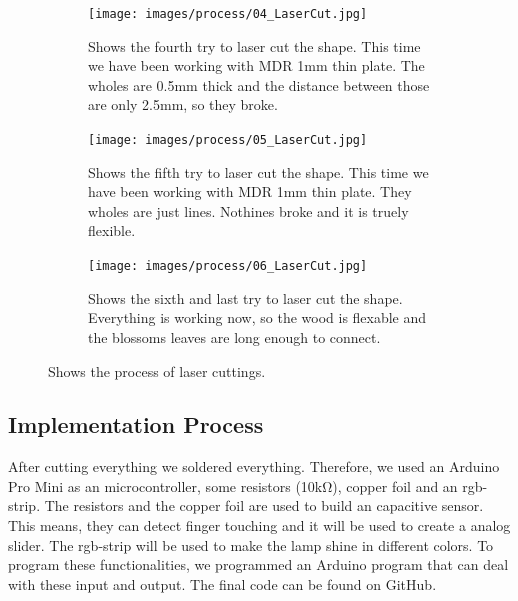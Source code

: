 \documentclass[doc.tex]{subfiles}
\begin{document}
\begin{figure}[H]
            \begin{subfigure}{.45\textwidth}
                \centering
                \texttt{[image: images/process/04\_LaserCut.jpg]}
                \caption{Shows the fourth try to laser cut the shape. This time we have been
                         working with MDR 1mm thin plate. The wholes are 0.5mm thick and the 
                         distance between those are only 2.5mm, so they broke.}
                \label{fig:04_LaserCut}
                \vspace{6mm}
            \end{subfigure}
            \hspace{1mm}
            \begin{subfigure}{.45\textwidth}
                \centering
                \texttt{[image: images/process/05\_LaserCut.jpg]}
                \caption{Shows the fifth try to laser cut the shape. This time we have been
                         working with MDR 1mm thin plate. They wholes are just lines. Nothines
                         broke and it is truely flexible.}
                \label{fig:04_LaserCut}
                \vspace{6mm}
            \end{subfigure}
            \hspace{1mm}
            \begin{subfigure}{.45\textwidth}
                \centering
                \texttt{[image: images/process/06\_LaserCut.jpg]}
                \caption{Shows the sixth and last try to laser cut the shape. Everything is 
                working now, so the wood is flexable and the blossoms leaves are long enough
                to connect. }
                \label{fig:04_LaserCut}
                \vspace{6mm}
            \end{subfigure}
            \caption{Shows the process of laser cuttings.}
            \label{fig:laserCutTests}
        \end{figure}
        \noindent

    \subsection{Implementation Process}
        \begin{flushleft}
            After cutting everything we soldered everything. Therefore, we used an Arduino Pro Mini \cite{arduinoProMini} 
            as an microcontroller, some resistors (10k\si{\ohm}), copper foil and an rgb-strip. \newline
            The resistors and the copper foil are used to build an capacitive sensor. \cite{Badger2019} 
            This means, they can detect finger touching and it will be used to create a analog slider.
            The rgb-strip will be used to make the lamp shine in different colors. \cite{Burgess2019} 
            \newline 
            \noindent
            To program these functionalities, we programmed an Arduino program that can deal with these input 
            and output. The final code can be found on GitHub. %
        \end{flushleft}
\end{document}
